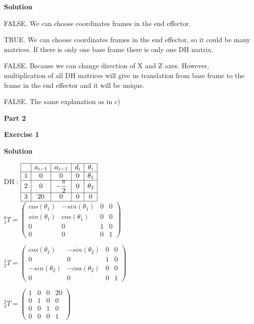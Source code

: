 \documentclass[8pt]{article}
\begin{document}
\textbf{Solution}

\medskip

\begin{list}{()~}{}
\item
FALSE. We can choose coordinates frames in the end effector.
\item
TRUE. We can choose coordinates frames in the end effector, so it could be many matrices. If there is only one base frame there is only one DH matrix.
\item
FALSE. Because we can change direction of X and Z axes. However, multiplication of all DH matrices will give us translation from base frame to the frame in the end effector and it will be unique.
\item
FALSE. The same explanation as in c)
\end{list}

\textbf{Part 2}	

\bigskip

\textbf{Exercise 1}		
		
\textbf{Solution}

\medskip

DH : 
$ \begin{array}{|c|c|c|c|c|}
\hline
\ &a_{i-1} & \alpha_{i-1} & d_i & \theta_i \\
\hline
1&0 & 0 & 0 & \theta_1 \\
\hline
2&0 & - \dfrac{\pi}{2} & 0 & \theta_2 \\
\hline
3&20 & 0 & 0 & 0\\
\hline
\end{array} $
\\

$^0_1T = \left( \begin{array}{cccc}
cos(\theta_1) & -sin(\theta_1) & 0 & 0 \\
sin(\theta_1) & cos(\theta_1) & 0 & 0 \\
0 & 0 & 1 & 0 \\
0 & 0 & 0 & 1
\end{array} \right) $

$^1_2T = \left( \begin{array}{cccc}
cos(\theta_2) & -sin(\theta_2) & 0 & 0 \\
0 & 0 & 1 & 0 \\
-sin(\theta_2) & -cos(\theta_2) & 0 & 0 \\
0 & 0 & 0 & 1
\end{array} \right) $

$^2_3T = \left( \begin{array}{cccc}
1 & 0 & 0 & 20 \\
0 & 1 & 0 & 0 \\
0& 0 & 1 & 0 \\
0 & 0 & 0 & 1
\end{array} \right) $
\end{document}
